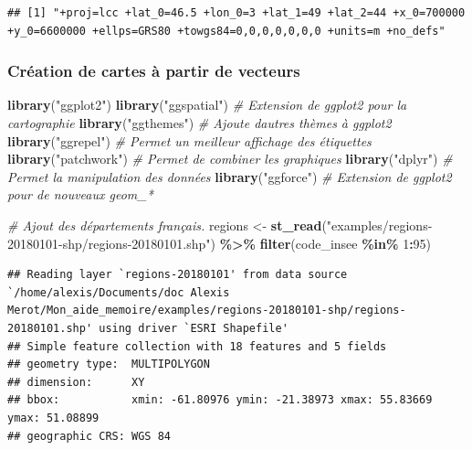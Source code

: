 \documentclass[
  french,
]{book}
\newenvironment{Shaded}{\begin{snugshade}}{\end{snugshade}}
\newcommand{\CommentTok}[1]{\textcolor[rgb]{0.56,0.35,0.01}{\textit{#1}}}
\newcommand{\DecValTok}[1]{\textcolor[rgb]{0.00,0.00,0.81}{#1}}
\newcommand{\KeywordTok}[1]{\textcolor[rgb]{0.13,0.29,0.53}{\textbf{#1}}}
\newcommand{\NormalTok}[1]{#1}
\newcommand{\OperatorTok}[1]{\textcolor[rgb]{0.81,0.36,0.00}{\textbf{#1}}}
\newcommand{\StringTok}[1]{\textcolor[rgb]{0.31,0.60,0.02}{#1}}
\begin{document}
\begin{Shaded}
\end{Shaded}

\begin{verbatim}
## [1] "+proj=lcc +lat_0=46.5 +lon_0=3 +lat_1=49 +lat_2=44 +x_0=700000 +y_0=6600000 +ellps=GRS80 +towgs84=0,0,0,0,0,0,0 +units=m +no_defs"
\end{verbatim}

\hypertarget{cruxe9ation-de-cartes-uxe0-partir-de-vecteurs}{%
\subsubsection{Création de cartes à partir de vecteurs}\label{cruxe9ation-de-cartes-uxe0-partir-de-vecteurs}}



\begin{Shaded}
\begin{Highlighting}[]
\KeywordTok{library}\NormalTok{(}\StringTok{"ggplot2"}\NormalTok{)}
\KeywordTok{library}\NormalTok{(}\StringTok{"ggspatial"}\NormalTok{) }\CommentTok{\# Extension de ggplot2 pour la cartographie}
\KeywordTok{library}\NormalTok{(}\StringTok{"ggthemes"}\NormalTok{) }\CommentTok{\# Ajoute d\textquotesingle{}autres thèmes à ggplot2}
\KeywordTok{library}\NormalTok{(}\StringTok{"ggrepel"}\NormalTok{) }\CommentTok{\# Permet un meilleur affichage des étiquettes}
\KeywordTok{library}\NormalTok{(}\StringTok{"patchwork"}\NormalTok{) }\CommentTok{\# Permet de combiner les graphiques}
\KeywordTok{library}\NormalTok{(}\StringTok{"dplyr"}\NormalTok{) }\CommentTok{\# Permet la manipulation des données}
\KeywordTok{library}\NormalTok{(}\StringTok{"ggforce"}\NormalTok{) }\CommentTok{\# Extension de ggplot2 pour de nouveaux geom\_*}

\CommentTok{\# Ajout des départements français.}
\NormalTok{regions \textless{}{-}}\StringTok{ }\KeywordTok{st\_read}\NormalTok{(}\StringTok{"examples/regions{-}20180101{-}shp/regions{-}20180101.shp"}\NormalTok{) }\OperatorTok{\%\textgreater{}\%}
\StringTok{  }\KeywordTok{filter}\NormalTok{(code\_insee }\OperatorTok{\%in\%}\StringTok{ }\DecValTok{1}\OperatorTok{:}\DecValTok{95}\NormalTok{)}
\end{Highlighting}
\end{Shaded}

\begin{verbatim}
## Reading layer `regions-20180101' from data source `/home/alexis/Documents/doc Alexis Merot/Mon_aide_memoire/examples/regions-20180101-shp/regions-20180101.shp' using driver `ESRI Shapefile'
## Simple feature collection with 18 features and 5 fields
## geometry type:  MULTIPOLYGON
## dimension:      XY
## bbox:           xmin: -61.80976 ymin: -21.38973 xmax: 55.83669 ymax: 51.08899
## geographic CRS: WGS 84
\end{verbatim}
\end{document}
